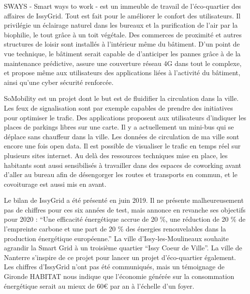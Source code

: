 SWAYS - Smart ways to work - est un immeuble de travail de l'éco-quartier des affaires de IssyGrid. 
Tout est fait pour le améliorer le confort des utilisateurs.
Il privilégie un éclairage naturel dans les bureaux et la purification de l'air par la biophilie, 
le tout grâce à un toit végétale. Des commerces de proximité et autres structures de loisir
sont installés à l'intérieur même du bâtiment. D'un point de vue technique, le bâtiment serait 
capable de d'anticiper les pannes grâce à de la maintenance prédictive, assure une couverture réseau
4G dans tout le complexe, et propose même aux utilisateurs des applications liées à l'activité du 
bâtiment, ainsi qu'une cyber sécurité renforcée. 

SoMobility est un projet dont le but est de fluidifier la circulation dans la ville. Les feux de 
signalisation sont par exemple capables de prendre des initiatives pour optimiser le trafic. 
Des applications proposent aux utilisateurs d'indiquer les places de parkings libres sur une carte.
Il y a actuellement un mini-bus qui se déplace sans chauffeur dans la ville. 
Les données de circulation de ma ville sont encore une fois open data. Il est possible de visualiser 
le trafic en temps réel sur plusieurs sites internet. 
Au delà des ressources techniques mise en place, les habitants sont aussi sensibilisés à travailler 
dans des espaces de coworking avant d'aller au bureau afin de désengorger les routes et transports 
en commun, et le covoiturage est aussi mis en avant. 

Le bilan de IssyGrid a été présenté en juin 2019. 
Il ne présente malheureusement pas de chiffres pour ces six années de test, mais annonce en revanche 
ses objectifs pour 2020 : ``Une efficacité énergétique accrue de 20 \%, une réduction de 20 \% 
de l’empreinte carbone et une part de 20 \% des énergies renouvelables dans la production 
énergétique européenne.''
La ville d'Issy-les-Moulineaux souhaite agrandir la Smart Grid à un troisième quartier 
``Issy Coeur de Ville''. La ville de Nanterre s'inspire de ce projet pour lancer un projet 
d'éco-quartier également. 
Les chiffres d'IssyGrid n'ont pas été communiqués, mais un témoignage de Gironde HABITAT nous indique
que l'économie générée sur la consommation énergétique serait au mieux de 60€ par an à l'échelle d'un
foyer.

